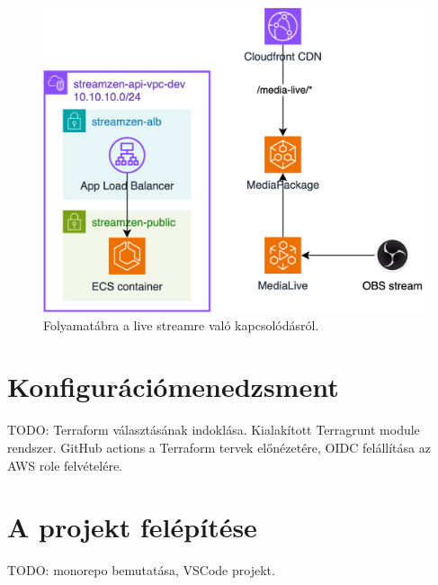 \begin{figure}[ht]
	\centering
	\includegraphics[width=120mm, keepaspectratio]{figures/dipterv_live2.png}
	\caption{Folyamatábra a live streamre való kapcsolódásról.}
	\label{fig:live2}
\end{figure}

\section{Konfigurációmenedzsment}

TODO: Terraform választásának indoklása. Kialakított Terragrunt module rendszer. GitHub actions a Terraform tervek előnézetére, OIDC felállítása az AWS role felvételére.

\section{A projekt felépítése}

TODO: monorepo bemutatása, VSCode projekt.
